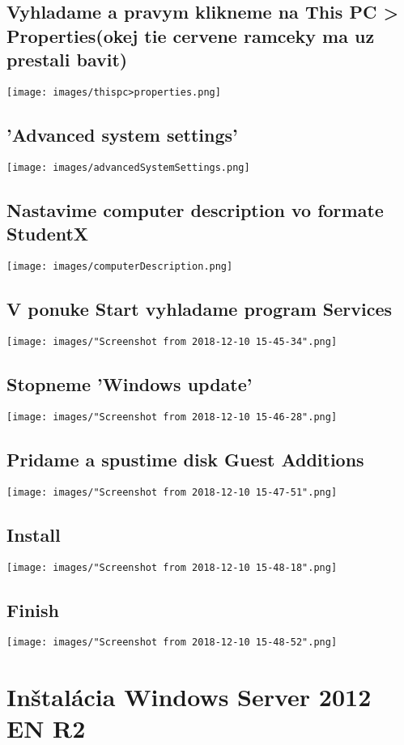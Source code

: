 \documentclass[slovak]{article}
\begin{document}
  \subsection{Vyhladame a pravym klikneme na This PC > Properties(okej tie cervene ramceky ma uz prestali bavit)}
  \texttt{[image: images/thispc>properties.png]}
  \subsection{'Advanced system settings'}
  \texttt{[image: images/advancedSystemSettings.png]}
  \subsection{Nastavime computer description vo formate StudentX}
  \texttt{[image: images/computerDescription.png]}
  \subsection{V ponuke Start vyhladame program Services}
  \texttt{[image: images/"Screenshot from 2018-12-10 15-45-34".png]}
  \subsection{Stopneme 'Windows update'}
  \texttt{[image: images/"Screenshot from 2018-12-10 15-46-28".png]}
  \subsection{Pridame a spustime disk Guest Additions}
  \texttt{[image: images/"Screenshot from 2018-12-10 15-47-51".png]}
  \subsection{Install}
  \texttt{[image: images/"Screenshot from 2018-12-10 15-48-18".png]}
  \subsection{Finish}
  \texttt{[image: images/"Screenshot from 2018-12-10 15-48-52".png]}

  \newpage
  \section{Inštalácia Windows Server 2012 EN R2}
\end{document}
